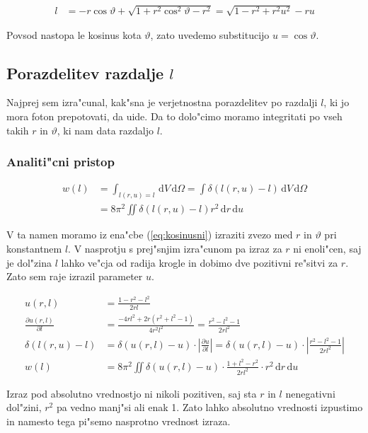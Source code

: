 \documentclass[a4paper,10pt]{article}
\renewcommand{\theta}{\vartheta}
\newcommand{\dd}{\,\mathrm{d}}
\begin{document}
\begin{align}
 l &= -r\cos\theta + \sqrt{1 + r^2\cos^2\theta - r^2} = \sqrt{1 - r^2 +r^2u^2} - ru
\end{align}

Povsod nastopa le kosinus kota $\theta$, zato uvedemo substitucijo $u=\cos\theta$. 

\subsection{Porazdelitev razdalje $l$}
Najprej sem izra"cunal, kak"sna je verjetnostna porazdelitev po razdalji $l$, ki jo mora foton prepotovati, da uide. Da to dolo"cimo moramo integritati po vseh takih $r$ in $\theta$, ki nam data razdaljo $l$. 

\subsubsection{Analiti"cni pristop}

\begin{align}
 w(l) &= \int_{l(r,u)=l} \dd V \dd \Omega = \int \delta(l(r,u)-l) \dd V \dd \Omega \\
  &= 8\pi^2\iint \delta(l(r,u)-l) r^2 \dd r \dd u
\end{align}

V ta namen moramo iz ena"cbe (\ref{eq:kosinusni}) izraziti zvezo med $r$ in $\theta$ pri konstantnem $l$. V nasprotju s prej"snjim izra"cunom pa izraz za $r$ ni enoli"cen, saj je dol"zina $l$ lahko ve"cja od radija krogle in dobimo dve pozitivni re"sitvi za $r$. Zato sem raje izrazil parameter $u$. 

\begin{align}
 u(r,l) &= \frac{1 - r^2 - l^2}{2rl} \\
 \frac{\partial u(r,l)}{\partial l} &=  \frac{ -4rl^2 + 2r(r^2+l^2-1) }{4r^2l^2} = \frac{r^2 - l^2 - 1}{2rl^2}\\
\delta(l(r,u)-l) &= \delta(u(r,l) - u) \cdot \left|\frac{\partial u}{\partial l}\right| = \delta(u(r,l) - u)\cdot \left|\frac{r^2 - l^2 - 1}{2rl^2}\right| \\
w(l) &= 8\pi^2 \iint \delta(u(r,l) - u)\cdot\frac{1 + l^2 - r^2}{2rl^2} \cdot r^2 \dd r \dd u
\end{align}


Izraz pod absolutno vrednostjo ni nikoli pozitiven, saj sta $r$ in $l$ nenegativni dol"zini, $r^2$ pa vedno manj"si ali enak 1. Zato lahko absolutno vrednosti izpustimo in namesto tega pi"semo nasprotno vrednost izraza. 
\end{document}
